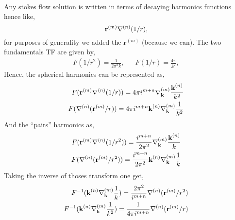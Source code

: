 Any stokes flow solution is written in terms of decaying harmonics functions hence like,
\begin{equation}
    \textbf{r}^{(m)}\mathbf{\nabla}^{(n)}(1/r),
\end{equation}
for purposes of generality we added the $\textbf{r}^{(m)}$ (because we can).
The two fundamentals TF are given by,
\begin{align}
     F(1/r^2) = \frac{1}{2\pi^2k},
     && F(1/r) = \frac{4\pi}{k^2},
\end{align}
Hence, the spherical harmonics can be represented as,
\begin{align}
    F(\textbf{r}^{(m)}\mathbf{\nabla}^{(n)}(1/r))
    =4\pi i^{m+n}
    \mathbf{\nabla}_\textbf{k}^{(m)} \frac{\textbf{k}^{(n)}  }{k^2}\\
    F(\mathbf{\nabla}^{(n)}(\textbf{r}^{(m)}/r))
    =4\pi i^{m+n}
    \textbf{k}^{(n)}  \mathbf{\nabla}_\textbf{k}^{(m)} \frac{ 1}{k^2}
\end{align}
And the ``pairs'' harmonics as,
\begin{align}
    F(\textbf{r}^{(m)}\mathbf{\nabla}^{(n)}(1/r^2))
    =\frac{i^{m+n}}{2\pi^2}
    \mathbf{\nabla}_\textbf{k}^{(m)} \frac{\textbf{k}^{(n)}  }{k}
    \\
    F(\mathbf{\nabla}^{(n)}(\textbf{r}^{(m)}/r^2))
    =\frac{i^{m+n}}{2\pi^2}
    \textbf{k}^{(n)}  \mathbf{\nabla}_\textbf{k}^{(m)} \frac{ 1}{k}
\end{align}
Taking the inverse of thoses transform one get,
\begin{align*}
    F^{-1}(\textbf{k}^{(n)}  \mathbf{\nabla}_\textbf{k}^{(m)} \frac{ 1}{k})
    =
    \frac{2\pi^2}{i^{m+n}}\mathbf{\nabla}^{(n)}(\textbf{r}^{(m)}/r^2)\\
    F^{-1}(\textbf{k}^{(n)}  \mathbf{\nabla}_\textbf{k}^{(m)} \frac{ 1}{k^2})
    =
    \frac{1}{4\pi i^{m+n}}\mathbf{\nabla}^{(n)}(\textbf{r}^{(m)}/r)
\end{align*}
